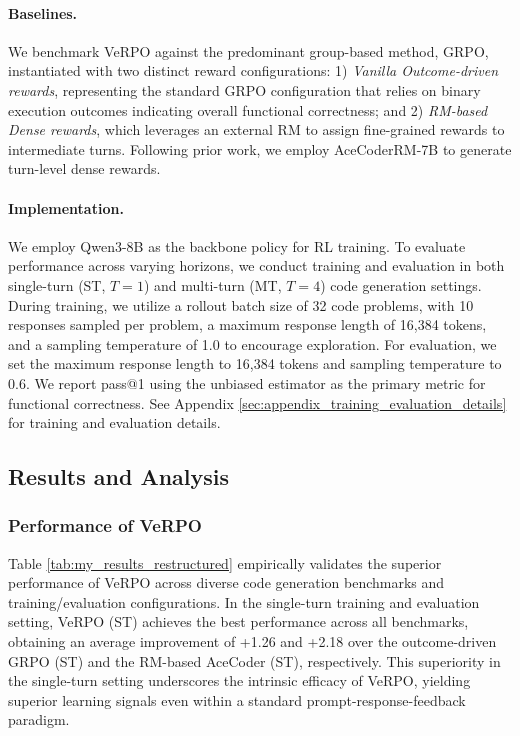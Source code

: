 \documentclass[11pt]{article}
\begin{document}
\paragraph{Baselines.}  We benchmark VeRPO against the predominant group-based method, GRPO, instantiated with two distinct reward configurations: 1) \textit{Vanilla Outcome-driven rewards}, representing the standard GRPO configuration that relies on binary execution outcomes indicating overall functional correctness; and 2) \textit{RM-based Dense rewards},  which leverages an external RM to assign fine-grained rewards to intermediate turns. Following prior work, we employ AceCoderRM-7B \cite{zeng-etal-2025-acecoder} to generate turn-level dense rewards.

\paragraph{Implementation.}  We employ Qwen3-8B as the backbone policy for RL training. To evaluate performance across varying horizons, we conduct training and evaluation in both single-turn (ST, $T=1$) and multi-turn (MT, $T=4$) code generation settings. During training, we utilize a rollout batch size of 32 code problems, with 10 responses sampled per problem, a maximum response length of 16,384 tokens, and a sampling temperature of 1.0 to encourage exploration. For evaluation, we set the maximum response length to 16,384 tokens and sampling temperature to 0.6. We report pass@1 using the unbiased estimator \cite{chen2021humaneval} as the primary metric for functional correctness. See Appendix \ref{sec:appendix_training_evaluation_details} for training and evaluation details.

\subsection{Results and Analysis}
\subsubsection{Performance of VeRPO}\label{Performance}
Table \ref{tab:my_results_restructured} empirically validates the superior performance of VeRPO across diverse code generation benchmarks and training/evaluation configurations.
In the single-turn training and evaluation setting, VeRPO (ST) achieves the best performance across all benchmarks, obtaining an average improvement of +1.26 and +2.18 over the outcome-driven GRPO (ST) and the RM-based AceCoder (ST), respectively. This superiority in the single-turn setting underscores the intrinsic efficacy of VeRPO, yielding superior learning signals even within a standard prompt-response-feedback paradigm.
\end{document}
